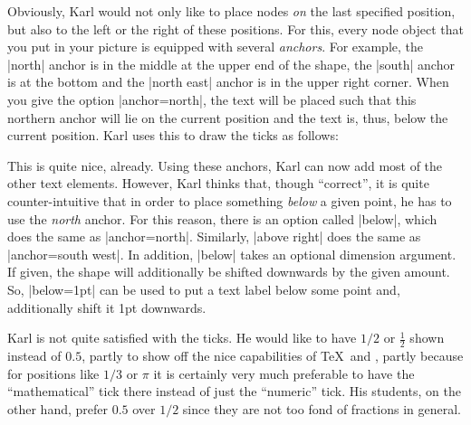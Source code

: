 Obviously, Karl would not only like to place nodes \emph{on} the last specified
position, but also to the left or the right of these positions. For this, every
node object that you put in your picture is equipped with several
\emph{anchors}. For example, the |north| anchor is in the middle at the upper
end of the shape, the |south| anchor is at the bottom and the |north east|
anchor is in the upper right corner. When you give the option |anchor=north|,
the text will be placed such that this northern anchor will lie on the current
position and the text is, thus, below the current position. Karl uses this to
draw the ticks as follows:
%
\begin{codeexample}[]
\end{codeexample}

This is quite nice, already. Using these anchors, Karl can now add most of the
other text elements. However, Karl thinks that, though ``correct'', it is quite
counter-intuitive that in order to place something \emph{below} a given point,
he has to use the \emph{north} anchor. For this reason, there is an option
called |below|, which does the same as |anchor=north|. Similarly, |above right|
does the same as |anchor=south west|. In addition, |below| takes an optional
dimension argument. If given, the shape will additionally be shifted downwards
by the given amount. So, |below=1pt| can be used to put a text label below some
point and, additionally shift it  1pt downwards.

Karl is not quite satisfied with the ticks. He would like to have $1/2$ or
$\frac{1}{2}$ shown instead of $0.5$, partly to show off the nice capabilities
of \TeX\ and \tikzname, partly because for positions like $1/3$ or $\pi$ it is
certainly very much preferable to have the ``mathematical'' tick there instead
of just the ``numeric'' tick. His students, on the other hand, prefer $0.5$
over $1/2$ since they are not too fond of fractions in general.

